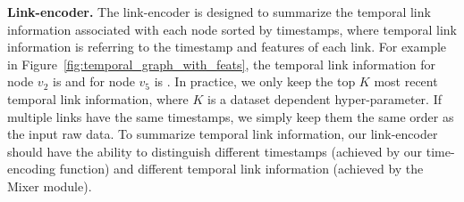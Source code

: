 \noindent\textbf{Link-encoder.}
The link-encoder is designed to summarize the temporal link information associated with each node sorted by timestamps, where temporal link information is referring to the timestamp and features of each link.
For example in Figure~\ref{fig:temporal_graph_with_feats}, the temporal link information for node $v_2$  is  and for node $v_5$ is .
In practice, we only keep the top $K$ most recent temporal link information, where $K$ is a dataset dependent hyper-parameter.
If multiple links have the same timestamps, we simply keep them the same order as the input raw data.
To summarize temporal link information, our link-encoder should have the ability to distinguish different timestamps (achieved by our time-encoding function) and different temporal link information (achieved by the Mixer module).

